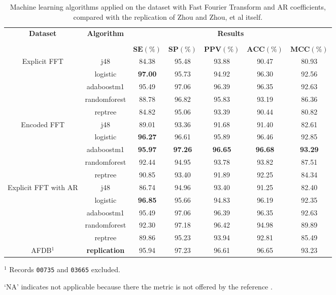 \begin{table}[h]
\begin{center}
\begin{threeparttable}
\caption{Machine learning algorithms applied on the dataset with Fast Fourier Transform and AR coefficients, compared with the replication of Zhou and Zhou, et al \cite{zhou2015} itself.}
\label{table:zhou_unimol_fft_ar}
\scriptsize
  \begin{tabular}{c c c c c c c}
  \toprule
  \textbf{Dataset} & \textbf{Algorithm} & \multicolumn{5}{c}{\textbf{Results}} \\
  \cline{3-7}
  \\
  & & $\mathbf{SE(\%)}$ & $\mathbf{SP(\%)}$ & $\mathbf{PPV(\%)}$ & $\mathbf{ACC(\%)}$ & $\mathbf{MCC(\%)}$\\
  \midrule  
  Explicit FFT & j48 & 84.38 & 95.48 & 93.88 & 90.47 & 80.93 \\ 
  & logistic & \textbf{97.00} & 95.73 & 94.92 & 96.30 & 92.56 \\
  & adaboostm1 & 95.49 & 97.06 & 96.39 & 96.35 & 92.63 \\
  & randomforest & 88.78 & 96.82 & 95.83 & 93.19 & 86.36 \\
  & reptree &  84.82 & 95.06 & 93.39 & 90.44 & 80.82 \\
  \hline
  Encoded FFT & j48 & 89.01 & 93.36 & 91.68 & 91.40 & 82.61 \\
  & logistic & \textbf{96.27} & 96.61 & 95.89 & 96.46 & 92.85 \\
  & adaboostm1 & \textbf{95.97} & \textbf{97.26} & \textbf{96.65} & \textbf{96.68} & \textbf{93.29} \\
  & randomforest & 92.44 & 94.95 & 93.78 & 93.82 & 87.51 \\
  & reptree  & 90.85 & 93.40 & 91.89 & 92.25 & 84.34 \\
  \hline
  Explicit FFT with AR & j48 & 86.74 & 94.96 & 93.40 & 91.25 & 82.40 \\
  & logistic & \textbf{96.85} & 95.66 & 94.83 & 96.19 & 92.35 \\
  & adaboostm1 & 95.49 & 97.06 & 96.39 & 96.35 & 92.63 \\
  & randomforest & 92.30 & 97.18 & 96.42 & 94.98 & 89.89 \\
  & reptree & 89.86 & 95.23 & 93.94 & 92.81 & 85.49 \\
  \hline
  AFDB$^1$ & \textbf{replication} & 95.94 & 97.23 & 96.61 & 96.65 & 93.23 \\
  \bottomrule
\end{tabular}
\begin{tablenotes}
	\item $^1$ Records \verb|00735| and \verb|03665| excluded.
 	\item ‘NA’ indicates not applicable because there the metric is not offered by the reference \cite{zhou2015}.
    \end{tablenotes}
\end{threeparttable}
\end{center}
\end{table}

